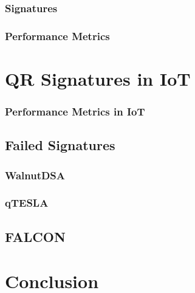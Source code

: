 \documentclass[conference]{IEEEtran}
\begin{document}
\subsubsection{Signatures} 
\subsubsection{Performance Metrics}

\section{QR Signatures in IoT}
\subsubsection{Performance Metrics in IoT}
\subsection{Failed Signatures}
\subsubsection{WalnutDSA}
\subsubsection{qTESLA}
\subsection{FALCON}

\section{Conclusion}



\end{document}

